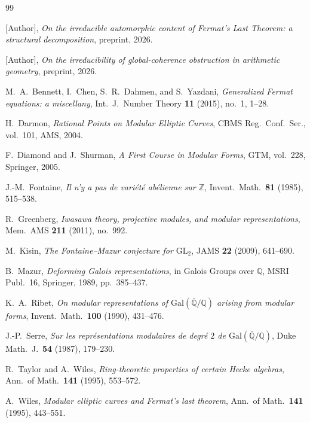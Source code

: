 \documentclass[12pt]{amsart}
\theoremstyle{definition}
\theoremstyle{remark}
\newcommand{\Gal}{\mathrm{Gal}}
\newcommand{\GL}{\mathrm{GL}}
\begin{document}
\begin{thebibliography}{99}

 [Author], \emph{On the irreducible automorphic content of Fermat's Last Theorem: a structural decomposition}, preprint, 2026.

 [Author], \emph{On the irreducibility of global-coherence obstruction in arithmetic geometry}, preprint, 2026.

 M.~A.~Bennett, I.~Chen, S.~R.~Dahmen, and S.~Yazdani, \emph{Generalized Fermat equations: a miscellany}, Int.\ J.\ Number Theory \textbf{11} (2015), no.~1, 1--28.

 H.~Darmon, \emph{Rational Points on Modular Elliptic Curves}, CBMS Reg.\ Conf.\ Ser., vol.~101, AMS, 2004.

 F.~Diamond and J.~Shurman, \emph{A First Course in Modular Forms}, GTM, vol.~228, Springer, 2005.

 J.-M.~Fontaine, \emph{Il n'y a pas de vari\'et\'e ab\'elienne sur $\mathbb{Z}$}, Invent.\ Math.\ \textbf{81} (1985), 515--538.

 R.~Greenberg, \emph{Iwasawa theory, projective modules, and modular representations}, Mem.\ AMS \textbf{211} (2011), no.~992.

 M.~Kisin, \emph{The Fontaine--Mazur conjecture for $\GL_2$}, JAMS \textbf{22} (2009), 641--690.

 B.~Mazur, \emph{Deforming Galois representations}, in Galois Groups over $\mathbb{Q}$, MSRI Publ.~16, Springer, 1989, pp.~385--437.

 K.~A.~Ribet, \emph{On modular representations of $\Gal(\bar{\mathbb{Q}}/\mathbb{Q})$ arising from modular forms}, Invent.\ Math.\ \textbf{100} (1990), 431--476.

 J.-P.~Serre, \emph{Sur les repr\'esentations modulaires de degr\'e $2$ de $\Gal(\bar{\mathbb{Q}}/\mathbb{Q})$}, Duke Math.\ J.\ \textbf{54} (1987), 179--230.

 R.~Taylor and A.~Wiles, \emph{Ring-theoretic properties of certain Hecke algebras}, Ann.\ of Math.\ \textbf{141} (1995), 553--572.

 A.~Wiles, \emph{Modular elliptic curves and Fermat's last theorem}, Ann.\ of Math.\ \textbf{141} (1995), 443--551.

\end{thebibliography}
\end{document}
